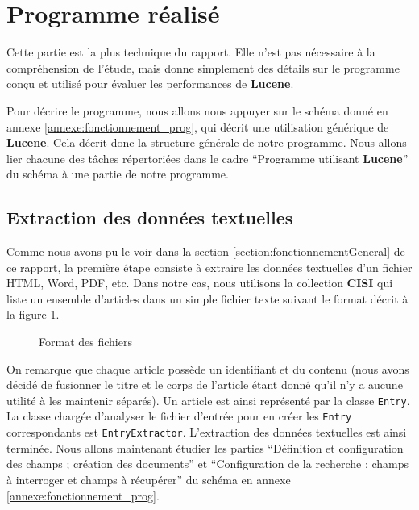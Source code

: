 \section{Programme réalisé}

Cette partie est la plus technique du rapport. Elle n’est pas nécessaire à la compréhension de l’étude, mais donne simplement des détails sur le programme conçu et utilisé pour évaluer les performances de \textbf{Lucene}.

Pour décrire le programme, nous allons nous appuyer sur le schéma donné en annexe \ref{annexe:fonctionnement_prog}, qui décrit une utilisation générique de \textbf{Lucene}. Cela décrit donc la structure générale de notre programme. Nous allons lier chacune des tâches répertoriées dans le cadre “Programme utilisant \textbf{Lucene}” du schéma à une partie de notre programme.

\subsection{Extraction des données textuelles}

Comme nous avons pu le voir dans la section \ref{section:fonctionnementGeneral} de ce rapport, la première étape consiste à extraire les données textuelles d’un fichier HTML, Word, PDF, etc. Dans notre cas, nous utilisons la collection \textbf{CISI} qui liste un ensemble d’articles dans un simple fichier texte suivant le format décrit à la figure \ref{formatTexte}.


 \begin{figure}[h]
\noindent{}
            \caption{Format des fichiers}
            \label{formatTexte}
 \end{figure}

On remarque que chaque article possède un identifiant et du contenu (nous avons décidé de fusionner le titre et le corps de l’article étant donné qu’il n’y a aucune utilité à les maintenir séparés). Un article est ainsi représenté par la classe \texttt{Entry}. La classe chargée d’analyser le fichier d’entrée pour en créer les \texttt{Entry} correspondants est \texttt{EntryExtractor}.
L’extraction des données textuelles est ainsi terminée. Nous allons maintenant étudier les parties “Définition et configuration des champs ; création des documents” et “Configuration de la recherche : champs à interroger et champs à récupérer” du schéma en annexe \ref{annexe:fonctionnement_prog}.

